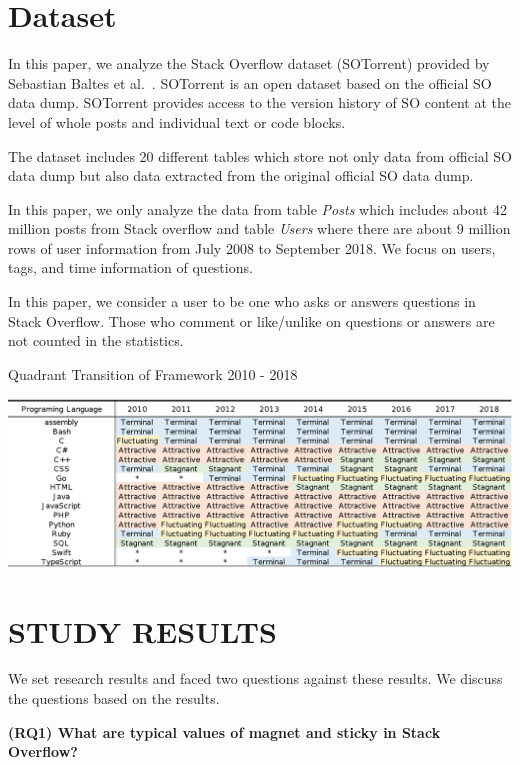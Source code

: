 \documentclass[english,preprint,JIP]{ipsj}
\begin{document}
\smallskip
\smallskip


\section{Dataset}
In this paper, we analyze the Stack Overflow dataset (SOTorrent) provided by Sebastian Baltes et al.~\cite{msr2019challenge}. SOTorrent is an open dataset based on the official SO data dump. SOTorrent provides access to the version history of SO content at the level of whole posts and individual text or code blocks.

The dataset includes 20 different tables which store not only data from official SO data dump but also data extracted from the original official SO data dump.

In this paper, we only analyze the data from table \emph{Posts} which includes about 42 million posts from Stack overflow and table \emph{Users} where there are about 9 million rows of user information from July 2008 to September 2018. We focus on  users, tags, and time information of questions.

In this paper, we consider a user to be one who asks or answers questions in Stack Overflow. Those who comment or like/unlike on questions or answers are not counted in the statistics.


\begin{table}[t]
 \centering
 \caption{Quadrant Transition of Framework 2010 - 2018} 
 \includegraphics[width=1.0\hsize]{img/frame2010-2018.eps} 
 \label{table1} 
\end{table}

\section{STUDY RESULTS} %
We set research results and faced two questions against these results. We discuss the questions based on the results.
\smallskip
\smallskip

\textbf{(RQ1) What are typical values of magnet and sticky in Stack Overflow?}
\smallskip
\end{document}
